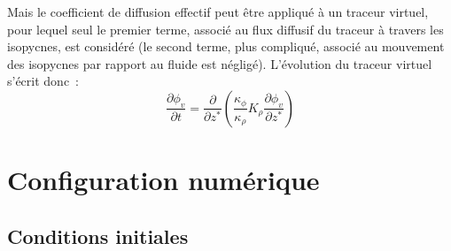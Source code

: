 \documentclass[a4paper,12pt]{article}
\begin{document}
        Mais le coefficient de diffusion effectif peut être appliqué à un traceur virtuel, pour lequel seul le premier terme, associé au flux diffusif du traceur à travers les isopycnes, est considéré (le second terme, plus compliqué, associé au mouvement des isopycnes par rapport au fluide est négligé). L'évolution du traceur virtuel s'écrit donc :
        \begin{equation}
            \frac{\partial\phi_v}{\partial t} = \frac{\partial}{\partial z^*} (\frac{\kappa_{\phi}}{\kappa_{\rho}}K_{\rho}\frac{\partial\phi_v}{\partial z^*})
        \end{equation}
        
\section{Configuration numérique}
    
    \subsection{Conditions initiales}
    
\end{document}

